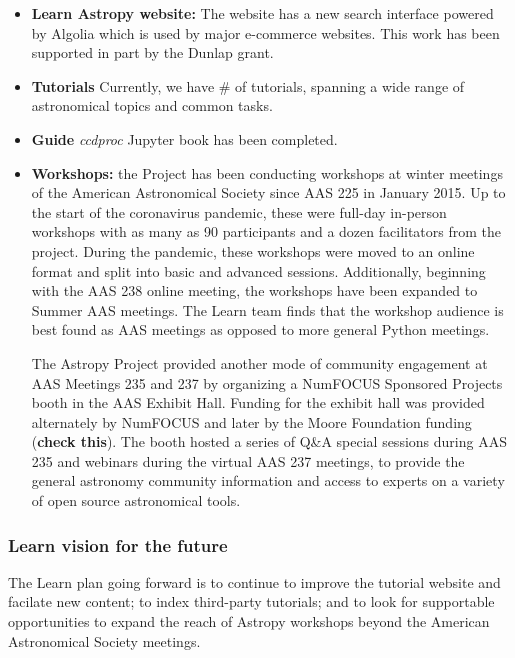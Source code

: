 \documentclass[modern]{aastex631}
\begin{document}
\begin{itemize}

\item {\bf Learn Astropy website:} The website has a new search interface powered by
Algolia which is used by major e-commerce websites. This work has been
supported in part by the Dunlap grant.

\item \textbf{Tutorials} Currently, we have \# of tutorials, spanning a wide range of astronomical topics and common tasks.

\item \textbf{Guide} {\it ccdproc} Jupyter book has been completed.

\item {\bf Workshops:} the Project has been conducting workshops at winter meetings
of the American Astronomical Society since AAS 225 in January 2015. Up to the
start of the coronavirus pandemic, these were full-day in-person workshops with
as many as 90 participants and a dozen facilitators from the project. During the
pandemic, these workshops were moved to an online format and split into
basic and advanced sessions. Additionally, beginning with the AAS 238 online
meeting, the workshops have been expanded to Summer AAS meetings. The Learn
team finds that the workshop audience is best found as AAS meetings as opposed
to more general Python meetings.

The Astropy Project provided another mode of community engagement at AAS Meetings 235 and 237 by organizing a NumFOCUS Sponsored Projects booth in the AAS Exhibit Hall. Funding for the exhibit hall was provided alternately by NumFOCUS and later by the Moore Foundation funding (\textbf{check this}). The booth hosted a series of Q\&A special sessions during AAS 235 and webinars during the virtual AAS 237 meetings, to provide the general astronomy community information and access to experts on a variety of open source astronomical tools.
\end{itemize}

\subsubsection{Learn vision for the future}

The Learn plan going forward is to continue to improve the tutorial website and facilate new content;
to index third-party tutorials; and to look for supportable opportunities to expand the reach of
Astropy workshops beyond the American Astronomical Society meetings.
\end{document}
